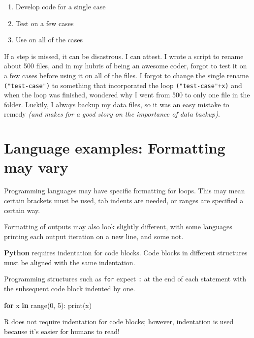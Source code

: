 \documentclass[
]{book}
\newenvironment{Shaded}{\begin{snugshade}}{\end{snugshade}}
\newcommand{\BuiltInTok}[1]{#1}
\newcommand{\ControlFlowTok}[1]{\textcolor[rgb]{0.13,0.29,0.53}{\textbf{#1}}}
\newcommand{\DecValTok}[1]{\textcolor[rgb]{0.00,0.00,0.81}{#1}}
\newcommand{\KeywordTok}[1]{\textcolor[rgb]{0.13,0.29,0.53}{\textbf{#1}}}
\newcommand{\NormalTok}[1]{#1}
\providecommand{\tightlist}{%
  \setlength{\itemsep}{0pt}\setlength{\parskip}{0pt}}
\begin{document}
\begin{enumerate}
\def\labelenumi{\arabic{enumi}.}
\tightlist
\item
  Develop code for a single case
\item
  Test on a few cases
\item
  Use on all of the cases
\end{enumerate}

If a step is missed, it can be disastrous. I can attest. I wrote a script to rename about 500 files, and in my hubris of being an awesome coder, forgot to test it on a few cases before using it on all of the files. I forgot to change the single rename \texttt{("test-case")} to something that incorporated the loop \texttt{("test-case"+x)} and when the loop was finished, wondered why I went from 500 to only one file in the folder. Luckily, I always backup my data files, so it was an easy mistake to remedy \emph{(and makes for a good story on the importance of data backup)}.

\section{Language examples: Formatting may vary}\label{language-examples-formatting-may-vary}

Programming languages may have specific formatting for loops. This may mean certain brackets must be used, tab indents are needed, or ranges are specified a certain way.

Formatting of outputs may also look slightly different, with some languages printing each output iteration on a new line, and some not.

\textbf{Python} requires indentation for code blocks. Code blocks in different structures must be aligned with the same indentation.

Programming structures such as \texttt{for} expect \texttt{:} at the end of each statement with the subsequent code block indented by one.

\begin{Shaded}
\begin{Highlighting}[]
\ControlFlowTok{for}\NormalTok{ x }\KeywordTok{in} \BuiltInTok{range}\NormalTok{(}\DecValTok{0}\NormalTok{, }\DecValTok{5}\NormalTok{):}
  \BuiltInTok{print}\NormalTok{(x)}
\end{Highlighting}
\end{Shaded}

R does not require indentation for code blocks; however, indentation is used because it's easier for humans to read!
\end{document}
